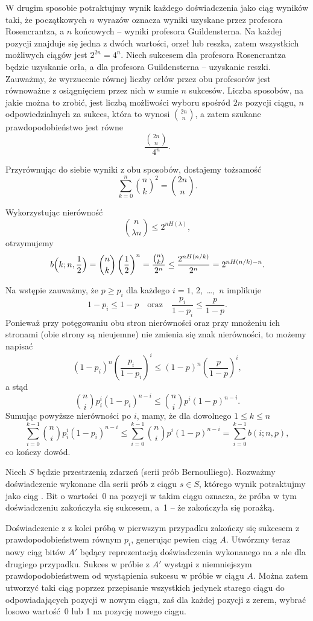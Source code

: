 W drugim sposobie potraktujmy wynik każdego doświadczenia jako  ciąg wyników taki, że początkowych $n$ wyrazów oznacza wyniki uzyskane przez profesora Rosencrantza, a $n$ końcowych -- wyniki profesora Guildensterna. Na każdej pozycji znajduje się jedna z dwóch wartości, orzeł lub reszka, zatem wszystkich możliwych ciągów jest $2^{2n}=4^n$. Niech sukcesem dla profesora Rosencrantza będzie uzyskanie orła, a dla profesora Guildensterna -- uzyskanie reszki. Zauważmy, że wyrzucenie równej liczby orłów przez obu profesorów jest równoważne z osiągnięciem przez nich w sumie $n$ sukcesów. Liczba sposobów, na jakie można to zrobić, jest liczbą możliwości wyboru spośród $2n$ pozycji ciągu, $n$ odpowiedzialnych za sukces, która to wynosi $\binom{2n}{n}$, a zatem szukane prawdopodobieństwo jest równe
\[
	\frac{\binom{2n}{n}}{4^n}.
\]

Przyrównując do siebie wyniki z obu sposobów, dostajemy tożsamość
\[
	\sum_{k=0}^n\binom{n}{k}^2 = \binom{2n}{n}.
\]

\exercise{} %
\noindent Wykorzystując nierówność
\[
	\binom{n}{\lambda n} \le 2^{nH(\lambda)},
\]
otrzymujemy
\[
	b\Bigl(k;n,\frac{1}{2}\Bigr) = \binom{n}{k}\left(\frac{1}{2}\right)^n = \frac{\binom{n}{k}}{2^n} \le \frac{2^{nH(n/k)}}{2^n} = 2^{nH(n/k)-n}.
\]

\exercise{} %
\noindent Na wstępie zauważmy, że $p\ge p_i$ dla każdego $i=1$, 2,~\dots,~$n$ implikuje
\[
	1-p_i \le 1-p \quad\text{oraz}\quad \frac{p_i}{1-p_i}\le\frac{p}{1-p}.
\]
Ponieważ przy potęgowaniu obu stron nierówności oraz przy mnożeniu ich stronami (obie strony są nieujemne) nie zmienia się znak nierówności, to możemy napisać
\[
	(1-p_i)^n\left(\frac{p_i}{1-p_i}\right)^i \le (1-p)^n\left(\frac{p}{1-p}\right)^i,
\]
a stąd
\[
	\binom{n}{i}p_i^i(1-p_i)^{n-i} \le \binom{n}{i}p^i(1-p)^{n-i}.
\]
Sumując powyższe nierówności po $i$, mamy, że dla dowolnego $1\le k\le n$
\[
	\sum_{i=0}^{k-1}\binom{n}{i}p_i^i(1-p_i)^{n-i} \le \sum_{i=0}^{k-1}\binom{n}{i}p^i(1-p)^{n-i} = \sum_{i=0}^{k-1}b(i;n,p),
\]
co kończy dowód.

\exercise{} %
\noindent Niech $S$ będzie przestrzenią zdarzeń (serii prób Bernoulliego). Rozważmy doświadczenie wykonane dla serii prób z ciągu $s\in S$, którego wynik potraktujmy jako ciąg . Bit o wartości~0 na  pozycji w takim ciągu oznacza, że  próba w tym doświadczeniu zakończyła się sukcesem, a~1 -- że zakończyła się porażką.

Doświadczenie z  z kolei próbą w pierwszym przypadku zakończy się sukcesem z prawdopodobieństwem równym $p_i$, generując pewien ciąg $A$. Utwórzmy teraz nowy ciąg bitów $A'$ będący reprezentacją doświadczenia wykonanego na $s$ ale dla drugiego przypadku. Sukces w  próbie z $A'$ wystąpi z niemniejszym prawdopodobieństwem od wystąpienia sukcesu w  próbie w ciągu $A$. Można zatem utworzyć taki ciąg poprzez przepisanie wszystkich jedynek starego ciągu do odpowiadających pozycji w nowym ciągu, zaś dla każdej pozycji z zerem, wybrać losowo wartość~0 lub 1 na pozycję nowego ciągu.

